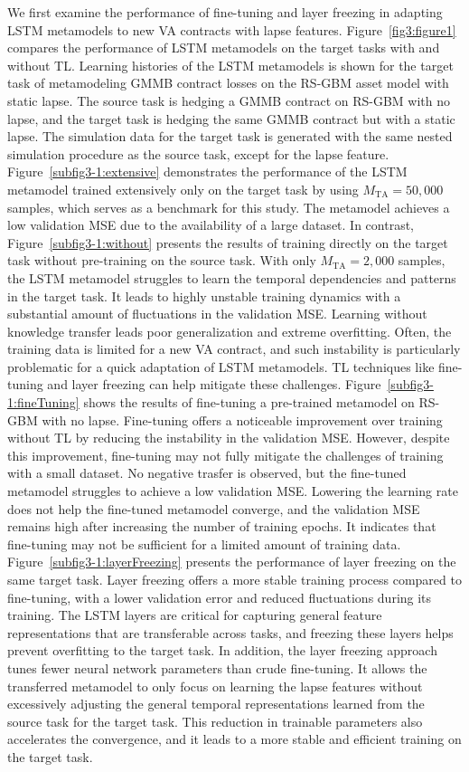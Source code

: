 We first examine the performance of fine-tuning and layer freezing in adapting LSTM metamodels to new VA contracts with lapse features.
Figure~\ref{fig3:figure1} compares the performance of LSTM metamodels on the target tasks with and without TL.
Learning histories of the LSTM metamodels is shown for the target task of metamodeling GMMB contract losses on the RS-GBM asset model with static lapse.
The source task is hedging a GMMB contract on RS-GBM with no lapse, and the target task is hedging the same GMMB contract but with a static lapse.
The simulation data for the target task is generated with the same nested simulation procedure as the source task, except for the lapse feature.
Figure~\ref{subfig3-1:extensive} demonstrates the performance of the LSTM metamodel trained extensively only on the target task by using $M_{\text{TA}} = 50,\!000$ samples, which serves as a benchmark for this study. 
The metamodel achieves a low validation MSE due to the availability of a large dataset.
In contrast, Figure~\ref{subfig3-1:without} presents the results of training directly on the target task without pre-training on the source task.
With only $M_{\text{TA}} = 2,\!000$ samples, the LSTM metamodel struggles to learn the temporal dependencies and patterns in the target task.
It leads to highly unstable training dynamics with a substantial amount of fluctuations in the validation MSE.
Learning without knowledge transfer leads poor generalization and extreme overfitting. 
Often, the training data is limited for a new VA contract, and such instability is particularly problematic for a quick adaptation of LSTM metamodels.
TL techniques like fine-tuning and layer freezing can help mitigate these challenges.
Figure~\ref{subfig3-1:fineTuning} shows the results of fine-tuning a pre-trained metamodel on RS-GBM with no lapse.
Fine-tuning offers a noticeable improvement over training without TL by reducing the instability in the validation MSE. 
However, despite this improvement, fine-tuning may not fully mitigate the challenges of training with a small dataset.
No negative trasfer is observed, but the fine-tuned metamodel struggles to achieve a low validation MSE.
Lowering the learning rate does not help the fine-tuned metamodel converge, and the validation MSE remains high after increasing the number of training epochs.
It indicates that fine-tuning may not be sufficient for a limited amount of training data.
Figure~\ref{subfig3-1:layerFreezing} presents the performance of layer freezing on the same target task.
Layer freezing offers a more stable training process compared to fine-tuning, with a lower validation error and reduced fluctuations during its training.
The LSTM layers are critical for capturing general feature representations that are transferable across tasks, and freezing these layers helps prevent overfitting to the target task.
In addition, the layer freezing approach tunes fewer neural network parameters than crude fine-tuning.
It allows the transferred metamodel to only focus on learning the lapse features without excessively adjusting the general temporal representations learned from the source task for the target task.
This reduction in trainable parameters also accelerates the convergence, and it leads to a more stable and efficient training on the target task.

